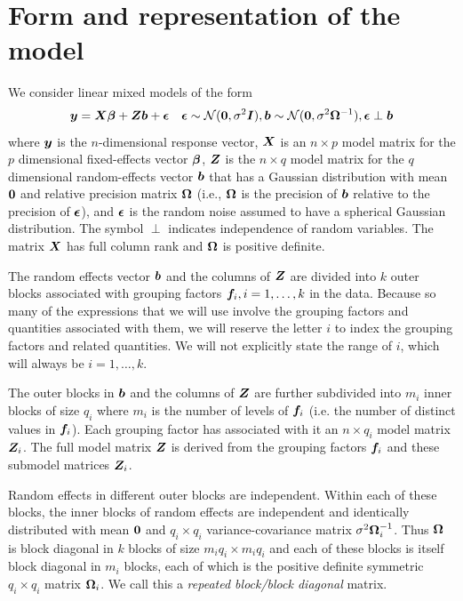 \documentclass[12pt]{article}
\begin{document}
\section{Form and representation of the model}
\label{sec:Form}

We consider linear mixed models of the form
\begin{equation}
  \label{eq:lmeGeneral}
  \bm{y}=\bm{X}\bm{\beta}+\bm{Z}\bm{b}+\bm{\epsilon}\quad
  \bm{\epsilon}\sim\mathcal{N}(\bm{0},\sigma^2\bm{I}),
  \bm{b}\sim\mathcal{N}(\bm{0},\sigma^2\bm{\Omega}^{-1}),
  \bm{\epsilon}\perp\bm{b}
\end{equation}
where $\bm{y}$ is the $n$-dimensional response vector, $\bm{X}$ is an
$n\times p$ model matrix for the $p$ dimensional fixed-effects vector
$\bm{\beta}$, $\bm{Z}$ is the $n\times q$ model matrix for the
$q$ dimensional random-effects vector $\bm{b}$ that has a Gaussian
distribution with mean $\bm{0}$ and relative precision matrix $\bm{\Omega}$
(i.e., $\bm{\Omega}$ is the precision of $\bm{b}$ relative to the precision
of $\bm{\epsilon}$), and $\bm{\epsilon}$ is the random noise assumed to have a
spherical Gaussian distribution.  The symbol $\perp$ indicates
independence of random variables.  The matrix $\bm{X}$ has full
column rank and $\bm{\Omega}$ is positive definite.

The random effects vector $\bm{b}$ and the columns of $\bm{Z}$ are divided
into $k$ outer blocks associated with grouping factors $\bm{f}_i,
i=1,\dots,k$ in the data.  Because so many of the expressions that we
will use involve the grouping factors and quantities associated with
them, we will reserve the letter $i$ to index the grouping factors and
related quantities. We will not explicitly state the range of $i$,
which will always be $i=1,\dots,k$.

The outer blocks in $\bm{b}$ and the columns of $\bm{Z}$ are further
subdivided into $m_i$ inner blocks of size $q_i$ where $m_i$ is the
number of levels of $\bm{f}_i$ (i.e.{} the number of distinct values in
$\bm{f}_i$). Each grouping factor has associated with it an $n\times
q_i$ model matrix $\bm{Z}_i$.  The full model matrix $\bm{Z}$ is derived
from the grouping factors $\bm{f}_i$ and these submodel matrices
$\bm{Z}_i$.

Random effects in different outer blocks are independent.  Within each
of these blocks, the inner blocks of random effects are independent
and identically distributed with mean $\bm{0}$ and $q_i\times q_i$
variance-covariance matrix $\sigma^2\bm{\Omega}_i^{-1}$.  Thus $\bm{\Omega}$ is
block diagonal in $k$ blocks of size $m_i q_i\times m_i q_i$ and each
of these blocks is itself block diagonal in $m_i$ blocks, each of
which is the positive definite symmetric $q_i\times q_i$ matrix
$\bm{\Omega}_i$.  We call this a \emph{repeated block/block diagonal}
matrix.
\end{document}
